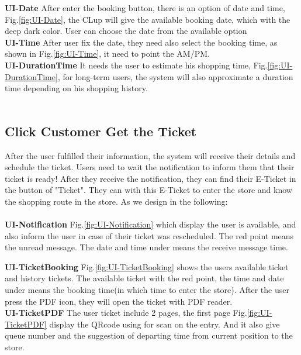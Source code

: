 \documentclass[a4paper,12pt]{report}
\begin{document}
\textbf{UI-Date} After enter the booking button, there is an option of date and time, Fig.\ref{fig:UI-Date}, the CLup will give the available booking date, which with the deep dark color. User can choose the date from the available option~\\

\textbf{UI-Time} After user fix the date, they need also select the booking time, as shown in Fig.\ref{fig:UI-Time}, it need to point the AM/PM.~\\

\textbf{UI-DurationTime} It needs the user to estimate his shopping time, Fig.\ref{fig:UI-DurationTime}, for long-term users, the system will also approximate a duration time depending on his shopping history.~\\
~\\
\subsection{Click Customer Get the Ticket}
After the user fulfilled their information, the system will receive their details and schedule the ticket. Users need to wait the notification to inform them that their ticket is ready! After they receive the notification, they can find their E-Ticket in the button of "Ticket". They can with this E-Ticket to enter the store and know the shopping route in the store. As we design in the following:~\\
~\\ 

\textbf{UI-Notification}  Fig.\ref{fig:UI-Notification} which display the user is available, and also inform the user in case of their ticket was rescheduled. The red point means the unread message. The date and time under means the receive message time.

\textbf{UI-TicketBooking}  Fig.\ref{fig:UI-TicketBooking} shows the users available ticket and history tickets. The available ticket with the red point, the time and date under means the booking time(in which time to enter the store). After the user press the PDF icon, they will open the ticket with PDF reader.~\\

\textbf{UI-TicketPDF} The user ticket include 2 pages, the first page Fig.\ref{fig:UI-TicketPDF} display the QRcode using for scan on the entry. And it also give queue number and the suggestion of departing time from current position to the store.~\\
\end{document}

